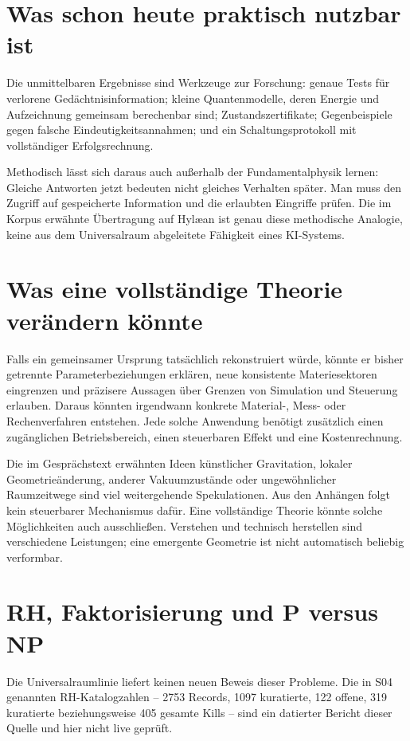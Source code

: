 \section{Was schon heute praktisch nutzbar ist}
Die unmittelbaren Ergebnisse sind Werkzeuge zur Forschung: genaue Tests für verlorene Gedächtnisinformation; kleine Quantenmodelle, deren Energie und Aufzeichnung gemeinsam berechenbar sind; Zustandszertifikate; Gegenbeispiele gegen falsche Eindeutigkeitsannahmen; und ein Schaltungsprotokoll mit vollständiger Erfolgsrechnung.

Methodisch lässt sich daraus auch außerhalb der Fundamentalphysik lernen: Gleiche Antworten jetzt bedeuten nicht gleiches Verhalten später. Man muss den Zugriff auf gespeicherte Information und die erlaubten Eingriffe prüfen. Die im Korpus erwähnte Übertragung auf Hylæan ist genau diese methodische Analogie, keine aus dem Universalraum abgeleitete Fähigkeit eines KI-Systems.

\section{Was eine vollständige Theorie verändern könnte}
Falls ein gemeinsamer Ursprung tatsächlich rekonstruiert würde, könnte er bisher getrennte Parameterbeziehungen erklären, neue konsistente Materiesektoren eingrenzen und präzisere Aussagen über Grenzen von Simulation und Steuerung erlauben. Daraus könnten irgendwann konkrete Material-, Mess- oder Rechenverfahren entstehen. Jede solche Anwendung benötigt zusätzlich einen zugänglichen Betriebsbereich, einen steuerbaren Effekt und eine Kostenrechnung.

Die im Gesprächstext erwähnten Ideen künstlicher Gravitation, lokaler Geometrieänderung, anderer Vakuumzustände oder ungewöhnlicher Raumzeitwege sind viel weitergehende Spekulationen. Aus den Anhängen folgt kein steuerbarer Mechanismus dafür. Eine vollständige Theorie könnte solche Möglichkeiten auch ausschließen. Verstehen und technisch herstellen sind verschiedene Leistungen; eine emergente Geometrie ist nicht automatisch beliebig verformbar.

\section{RH, Faktorisierung und P versus NP}
Die Universalraumlinie liefert keinen neuen Beweis dieser Probleme. Die in S04 genannten RH-Katalogzahlen -- 2753 Records, 1097 kuratierte, 122 offene, 319 kuratierte beziehungsweise 405 gesamte Kills -- sind ein datierter Bericht dieser Quelle und hier nicht live geprüft.

